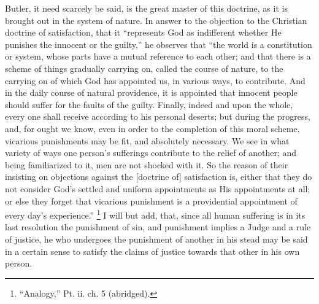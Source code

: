 Butler, it need scarcely be said, is the great master of this
doctrine, as it is brought out in the system of nature. In answer to
the objection to the Christian doctrine of satisfaction, that it
``represents God as indifferent whether He punishes the innocent
or the guilty,'' he observes that ``the world is a
constitution or system, whose parts have a mutual reference to each
other; and that there is a scheme of things gradually carrying on,
called the course of nature, to the carrying on of which God has
appointed us, in various ways, to contribute. And in the daily course
of natural providence, it is appointed that innocent people should
suffer for the faults of the guilty. Finally, indeed and upon the
whole, every one shall receive according to his personal deserts; but
during the progress, and, for ought we know, even in order to the
completion of this moral scheme, vicarious punishments may be fit, and
absolutely necessary. We see in what variety of ways one person's
sufferings contribute to the relief of another; and being familiarized
to it, men are not shocked with it. So the reason of their insisting
on objections against the [doctrine of] satisfaction is, either that
they do not consider God's settled and uniform appointments as His
appointments at all; or else they forget that vicarious punishment is
a providential appointment of every day's experience.'' \footnote{``Analogy,'' Pt. ii. ch. 5 (abridged).} I will but add, that, since all human suffering is in its last
resolution the punishment of sin, and punishment implies a Judge and a
rule of justice, he who undergoes the punishment of another in his
stead may be said in a certain sense to satisfy the claims of justice
towards that other in his own person.

